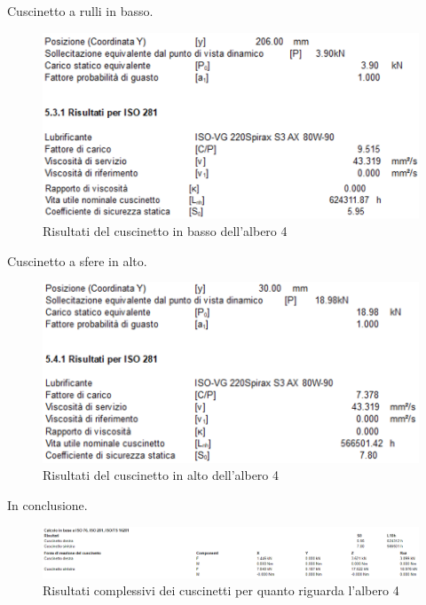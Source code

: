 Cuscinetto a rulli in basso.
\begin{figure}[h]
    \centering
        \includegraphics[scale=0.6]{Immagini/RisultatiCuscinettoBassoAlbero4.png}
    \caption{Risultati del cuscinetto in basso dell'albero 4}
    \label{fig:RisultatiCuscinettoBassoAlbero4}
\end{figure}
\newpage
Cuscinetto a sfere in alto.
\begin{figure}[h]
    \centering
    \includegraphics[scale=0.6]{Immagini/RisultatiCuscinettoAltoAlbero4.png}
    \caption{Risultati del cuscinetto in alto dell'albero 4}
    \label{fig:RisultatiCuscinettoAltoAlbero4}
\end{figure}

In conclusione.
\begin{figure}[h]
    \centering
    \includegraphics[scale=0.55]{Immagini/RisultatiCuscinettiAlbero4.png}
    \caption{Risultati complessivi dei cuscinetti per quanto riguarda l'albero 4}
    \label{fig:RisultatiCuscinettiAlbero4}
\end{figure}

